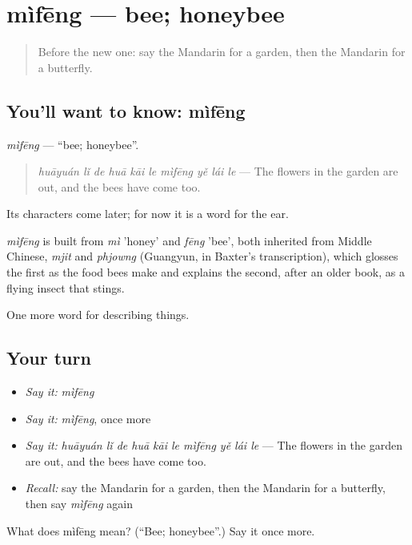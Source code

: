 \section[mìfēng]{mìfēng — bee; honeybee}

\label{lesson:ZH-C224-mifeng}



\begin{quote}
Before the new one: say the Mandarin for a garden, then the Mandarin for a butterfly.
\end{quote}

\subsection*{You'll want to know: mìfēng}
\emph{mìfēng} — \textquotedblleft{}bee; honeybee\textquotedblright{}.

\begin{quote}
\emph{huāyuán lǐ de huā kāi le mìfēng yě lái le} — The flowers in the garden are out, and the bees have come too.
\end{quote}

Its characters come later; for now it is a word for the ear.

\begin{cousinweb}
\emph{mìfēng} is built from \emph{mì} 'honey' and \emph{fēng} 'bee', both inherited from Middle Chinese, \emph{mjit} and \emph{phjowng} (Guangyun, in Baxter's transcription), which glosses the first as the food bees make and explains the second, after an older book, as a flying insect that stings.
\end{cousinweb}

\begin{grammarlens}[title={What you've built}]
One more word for describing things.
\end{grammarlens}

\subsection*{Your turn}
\begin{itemize}
\raggedright
  \item \emph{Say it:} \emph{mìfēng}
  \item \emph{Say it:} \emph{mìfēng}, once more
  \item \emph{Say it:} \emph{huāyuán lǐ de huā kāi le mìfēng yě lái le} — The flowers in the garden are out, and the bees have come too.
  \item \emph{Recall:} say the Mandarin for a garden, then the Mandarin for a butterfly, then say \emph{mìfēng} again
\end{itemize}

\begin{tcolorbox}[breakable,colback=teal!4,colframe=teal!35!black,title={Before you move on}]
What does mìfēng mean? (\textquotedblleft{}Bee; honeybee\textquotedblright{}.) Say it once more.
\end{tcolorbox}
